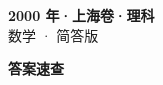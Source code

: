 \documentclass[zihao=-4, a4paper]{ctexart}
\begin{document}
\begin{center}
  {\Large\bfseries 2000 年·上海卷·理科}\\[4pt]
  {\large 数学 · 简答版}
\end{center}
\medskip
{}

\clearpage
{}
\begin{center}{\Large\bfseries 答案速查}\end{center}
\medskip

\end{document}
